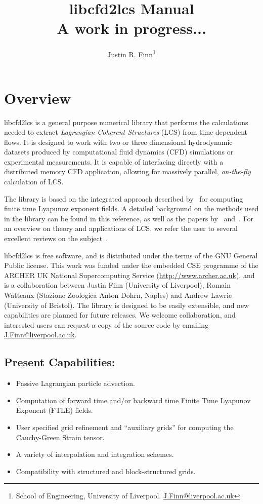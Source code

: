 \documentclass[letterpaper,11pt]{article}
\title{libcfd2lcs Manual \\ {\small\color{red} A work in progress...}}
\author{Justin R. Finn\thanks{School of Engineering, University of Liverpool.  \href{mailto:J.Finn@liverpool.ac.uk}{J.Finn@liverpool.ac.uk}}}
\begin{document}
\maketitle
\section{Overview}
libcfd2lcs is a general purpose numerical library that performs the calculations needed to extract \emph{Lagrangian Coherent Structures} (LCS) from time dependent flows.  It is designed to work with two or three dimensional hydrodynamic datasets produced by computational fluid dynamics (CFD) simulations or experimental measurements.  It is capable of interfacing directly with a distributed memory CFD application, allowing for massively parallel, \emph{on-the-fly} calculation of LCS.

The library is based on the integrated approach described by~\cite{finn2013integrated} for computing finite time Lyapunov exponent fields.  A detailed background on the methods used in the library can be found in this reference, as well as the papers by~\cite{brunton2010fast} and~\cite{leung2011eulerian}.  For an overview on theory and applications of LCS, we refer the user to several excellent reviews on the subject~\cite{haller2015lagrangian,peacock2015introduction,peacock2010introduction,samelson2013lagrangian}.

libcfd2lcs is free software, and is distributed under the terms of the GNU General Public license.  This work was funded under the embedded CSE programme of the ARCHER UK National Supercomputing Service (\url{http://www.archer.ac.uk}), and is a collaboration between Justin Finn (University of Liverpool), Romain Watteaux (Stazione Zoologica Anton Dohrn, Naples) and Andrew Lawrie (University of Bristol).  The library is designed to be easily extensible, and new capabilities are planned for future releases.  We welcome collaboration, and interested users can request a copy of the source code by emailing \href{mailto:J.Finn@liverpool.ac.uk}{J.Finn@liverpool.ac.uk}.
 
\subsection*{Present Capabilities:}
 \begin{itemize}
 \item Passive Lagrangian particle advection.
 \item Computation of forward time and/or backward time Finite Time Lyapunov Exponent (FTLE) fields.
 \item User specified grid refinement and ``auxiliary grids'' for computing the Cauchy-Green Strain tensor. 
 \item A variety of interpolation and integration schemes.
 \item Compatibility with structured and block-structured grids.
\end{itemize}
\end{document}

